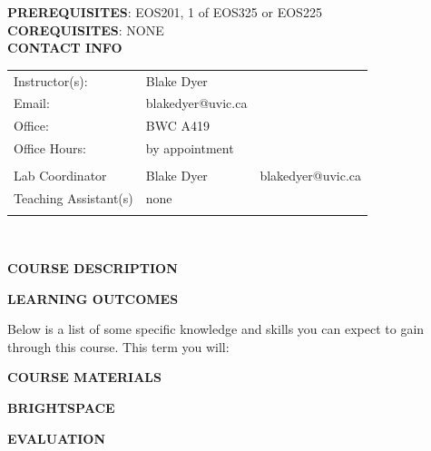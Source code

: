 \documentclass[11pt]{article}
\begin{document}
\textbf{PREREQUISITES}: EOS201, 1 of EOS325 or EOS225\\
\textbf{COREQUISITES}: NONE\\

\textbf{CONTACT INFO}

\begin{center}
  \centering
  \begin{tabular}{ L{.25\linewidth}L{.25\linewidth}L{.25\linewidth} }
    Instructor(s):      & Blake Dyer &  \\
    Email:      & blakedyer@uvic.ca &  \\
    Office:      & BWC A419 &  \\
    Office Hours:      & by appointment &  \\
          &  &  \\
    Lab Coordinator      & Blake Dyer &  blakedyer@uvic.ca\\
Teaching Assistant(s)      & none &  \\
      &  &  \\
  \end{tabular}\\
\end{center}

\begin{center}
\textbf{COURSE DESCRIPTION}
\end{center}





\textbf{LEARNING OUTCOMES}

Below is a list of some specific knowledge and skills you can expect to gain through this course. This term you will:
\begin{itemize}
	\setlength\itemsep{0em}
        {\item \learningoutcome}
\end{itemize}

\textbf{COURSE MATERIALS}



\textbf{BRIGHTSPACE}



\begin{center}
  \textbf{EVALUATION}
\end{center}
\end{document}
